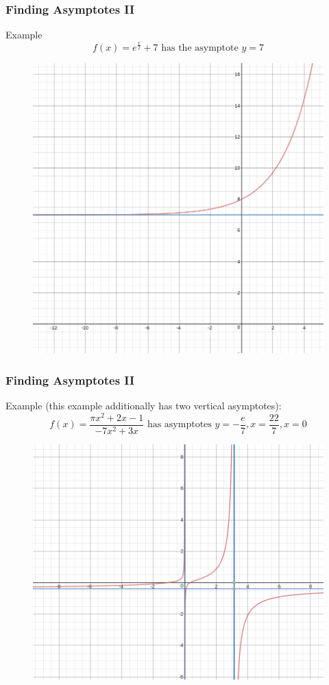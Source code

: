 \documentclass[xcolor=dvipsnames]{beamer}
\begin{document}
\begin{frame}
  \frametitle{Finding Asymptotes II}
Example
\begin{equation}
  \label{eq:tohwoiph}
f(x)=e^{\frac{x}{2}}+7\mbox{ has the asymptote }y=7
\end{equation}
\begin{figure}[h]
\includegraphics[scale=.25]{./diagrams/asymp3.png}
\end{figure}
\end{frame}

\begin{frame}
  \frametitle{Finding Asymptotes II}
Example (this example additionally has two
  vertical asymptotes):
\begin{equation}
  \label{eq:ahyoimij}
  f(x)=\frac{\pi{}x^{2}+2x-1}{-7x^{2}+3x}\mbox{ has asymptotes }y=-\frac{e}{7},x=\frac{22}{7},x=0
\end{equation}
\begin{figure}[h]
\includegraphics[scale=.25]{./diagrams/asymp4.png}
\end{figure}
\end{frame}
\end{document}
